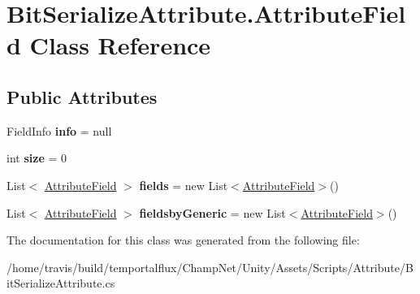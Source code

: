 \hypertarget{class_bit_serialize_attribute_1_1_attribute_field}{\section{Bit\-Serialize\-Attribute.\-Attribute\-Field Class Reference}
\label{class_bit_serialize_attribute_1_1_attribute_field}
}
\subsection*{Public Attributes}
\begin{DoxyCompactItemize}
\item 
\hypertarget{class_bit_serialize_attribute_1_1_attribute_field_a5202edf5d3e0632b952595fba53f171b}{Field\-Info {\bfseries info} = null}\label{class_bit_serialize_attribute_1_1_attribute_field_a5202edf5d3e0632b952595fba53f171b}

\item 
\hypertarget{class_bit_serialize_attribute_1_1_attribute_field_a7ba4865ba3f2c1f6ee86966730861394}{int {\bfseries size} = 0}\label{class_bit_serialize_attribute_1_1_attribute_field_a7ba4865ba3f2c1f6ee86966730861394}

\item 
\hypertarget{class_bit_serialize_attribute_1_1_attribute_field_a5ca46d341ee4b04a261730b04004aa0e}{List$<$ \hyperlink{class_bit_serialize_attribute_1_1_attribute_field}{Attribute\-Field} $>$ {\bfseries fields} = new List$<$\hyperlink{class_bit_serialize_attribute_1_1_attribute_field}{Attribute\-Field}$>$()}\label{class_bit_serialize_attribute_1_1_attribute_field_a5ca46d341ee4b04a261730b04004aa0e}

\item 
\hypertarget{class_bit_serialize_attribute_1_1_attribute_field_a68e769f45a1b45e8a4d73102c1fae266}{List$<$ \hyperlink{class_bit_serialize_attribute_1_1_attribute_field}{Attribute\-Field} $>$ {\bfseries fieldsby\-Generic} = new List$<$\hyperlink{class_bit_serialize_attribute_1_1_attribute_field}{Attribute\-Field}$>$()}\label{class_bit_serialize_attribute_1_1_attribute_field_a68e769f45a1b45e8a4d73102c1fae266}

\end{DoxyCompactItemize}


The documentation for this class was generated from the following file\-:\begin{DoxyCompactItemize}
\item 
/home/travis/build/temportalflux/\-Champ\-Net/\-Unity/\-Assets/\-Scripts/\-Attribute/Bit\-Serialize\-Attribute.\-cs\end{DoxyCompactItemize}
